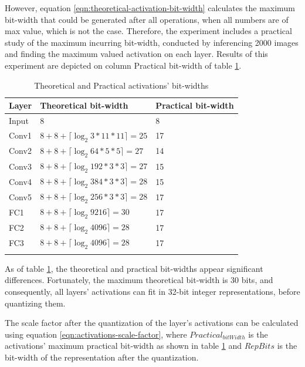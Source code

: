 However, equation \ref{eqn:theoretical-activation-bit-width} calculates the maximum bit-width that could be generated after all operations, when all numbers are of max value, which is not the case. Therefore, the experiment includes a practical study of the maximum incurring bit-width, conducted by inferencing 2000 images and finding the maximum valued activation on each layer. Results of this experiment are depicted on column Practical bit-width of table \ref{tab:Theoretical-and-Practical-activations-bit-widths}.

\begin{table}[H]
	\caption{Theoretical and Practical activations' bit-widths}
	\label{tab:Theoretical-and-Practical-activations-bit-widths}
	\centering
	\begin{tabular}{lll}
		\toprule
		\textbf{Layer} & \textbf{Theoretical bit-width} & \textbf{Practical bit-width}\\
		\midrule
			Input & 8 & 8\\
			Conv1 & $ 8 + 8 + \lceil \log_2 3 * 11 * 11 \rceil = 25 $ & 17\\
			Conv2 & $ 8 + 8 + \lceil \log_2 64 * 5 * 5 \rceil = 27$ & 14\\
			Conv3 & $ 8 + 8 + \lceil \log_2 192 * 3 * 3 \rceil = 27$ & 15\\
			Conv4 & $ 8 + 8 + \lceil \log_2 384 * 3 * 3 \rceil = 28$ & 15\\
			Conv5 & $ 8 + 8 + \lceil \log_2 256 * 3 * 3 \rceil = 28$ & 17\\
			FC1 & $ 8 + 8 + \lceil \log_2 9216 \rceil = 30$ & 17\\
			FC2 & $ 8 + 8 + \lceil \log_2 4096 \rceil = 28$ & 17\\
			FC3 & $ 8 + 8 + \lceil \log_2 4096 \rceil = 28$ & 17\\
		\bottomrule\\
	\end{tabular}
\end{table}

As of table \ref{tab:Theoretical-and-Practical-activations-bit-widths}, the theoretical and practical bit-widths appear significant differences. Fortunately, the maximum theoretical bit-width is 30 bits, and consequently, all layers' activations can fit in 32-bit integer representations, before quantizing them.

The scale factor after the quantization of the layer's activations can be calculated using equation \ref{eqn:activations-scale-factor}, where $Practical_{bitWidth}$ is the activations' maximum practical bit-width as shown in table \ref{tab:Theoretical-and-Practical-activations-bit-widths} and $RepBits$ is the bit-width of the representation after the quantization.

